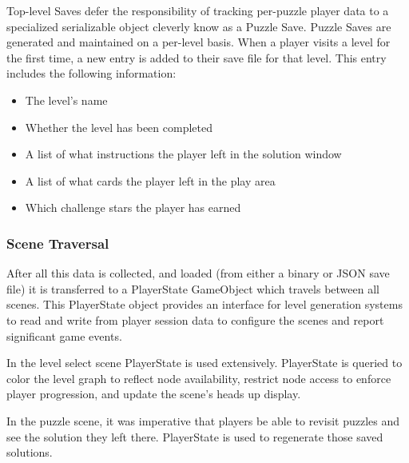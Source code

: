 Top-level Saves defer the responsibility of tracking per-puzzle player data to a specialized serializable object cleverly know as a Puzzle Save. Puzzle Saves are generated and maintained on a per-level basis. When a player visits a level for the first time, a new entry is added to their save file for that level. This entry includes the following information:
\begin{itemize}
    \item The level's name
    \item Whether the level has been completed
    \item A list of what instructions the player left in the solution window
    \item A list of what cards the player left in the play area
    \item Which challenge stars the player has earned
\end{itemize}

\subsubsection{Scene Traversal}
After all this data is collected, and loaded (from either a binary or JSON save file) it is transferred to a PlayerState GameObject which travels between all scenes. This PlayerState object provides an interface for level generation systems to read and write from player session data to configure the scenes and report significant game events.

In the level select scene PlayerState is used extensively. PlayerState is queried to color the level graph to reflect node availability, restrict node access to enforce player progression, and update the scene's heads up display.

In the puzzle scene, it was imperative that players be able to revisit puzzles and see the solution they left there. PlayerState is used to regenerate those saved solutions.
